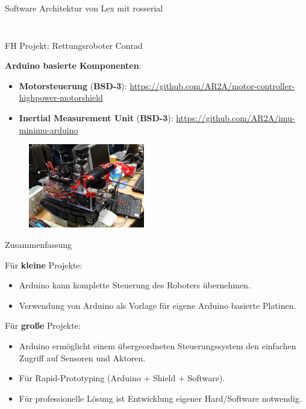 \documentclass{beamer}
\begin{document}
\begin{frame}{Software Architektur von Lex mit rosserial}
\begin{columns}
\begin{column}{0.3\textwidth}
\begin{figure}[H]
		\end{figure}
	\end{column}
\end{columns}
\end{frame}
\begin{frame}{FH Projekt: Rettungsroboter Conrad}
\begin{large}\textbf{Arduino basierte Komponenten}:\end{large}
\begin{itemize}
	\item \textbf{Motorsteuerung} (\textbf{BSD-3}): \url{https://github.com/AR2A/motor-controller-highpower-motorshield}
\end{itemize}
\begin{itemize}
	\item \textbf{Inertial Measurement Unit} (\textbf{BSD-3}): \url{https://github.com/AR2A/imu-minimu-arduino}
\end{itemize}
\begin{figure}[H]
	\centering
	\includegraphics[width=0.45\textwidth]{./images/robot-conrad.jpg}
\end{figure}
\end{frame}
\begin{frame}{Zusammenfassung}
\begin{large}F\"ur \textbf{kleine} Projekte:\end{large}
\begin{itemize}
	\item Arduino kann komplette Steuerung des Roboters \"ubernehmen.
	\item Verwendung von Arduino als Vorlage f\"ur eigene Arduino basierte Platinen.
\end{itemize}
\vspace{20px}
\begin{large}F\"ur \textbf{gro\ss{}e} Projekte:\end{large}
\begin{itemize}
	\item Arduino erm\"oglicht einem \"ubergeordneten Steuerungssystem den einfachen Zugriff auf Sensoren und Aktoren.
	\item F\"ur Rapid-Prototyping (Arduino + Shield + Software).
	\item F\"ur professionelle L\"osung ist Entwicklung eigener Hard/Software notwendig.
\end{itemize}
\end{frame}
\end{document}
